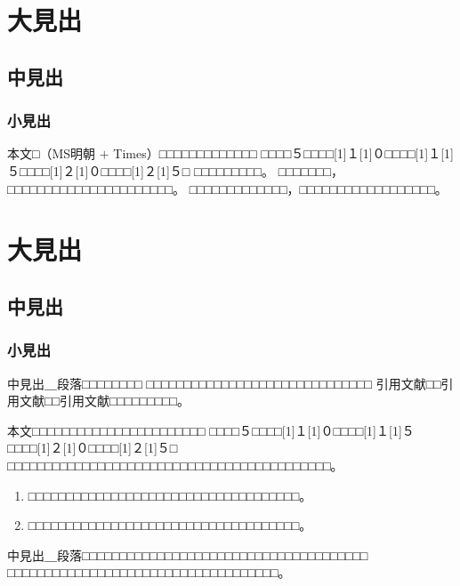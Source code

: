 \documentclass[fleqn]{ieej-report2}%
\begin{document}
%
%
\section{大見出}

\subsection{中見出}

\subsubsection{小見出}
本文□（MS明朝 $+$ Times）□□□□□□□□□□□□□
□□□□５□□□□\scalebox{0.5}[1]{１}\scalebox{0.5}[1]{０}□□□□\scalebox{0.5}[1]{１}\scalebox{0.5}[1]{５}□□□□\scalebox{0.5}[1]{２}\scalebox{0.5}[1]{０}□□□□\scalebox{0.5}[1]{２}\scalebox{0.5}[1]{５}□
□□□□□□□□□。
□□□□□□□，□□□□□□□□□□□□□□□□□□□□□□。
□□□□□□□□□□□□□，□□□□□□□□□□□□□□□□□□。

\section{大見出}

\subsection{中見出}

\subsubsection{小見出}


中見出＿段落□□□□□□□□
□□□□□□□□□□□□□□□□□□□□□□□□□□□□□□
引用文献\cite{IEEJformat}□□引用文献\cite{bib2,bib3}□□引用文献\cite{bib4,bib5,bib6,bib7}□□□□□□□□□。

本文□□□□□□□□□□□□□□□□□□□□□□□
□□□□５□□□□\scalebox{0.5}[1]{１}\scalebox{0.5}[1]{０}□□□□\scalebox{0.5}[1]{１}\scalebox{0.5}[1]{５}□□□□\scalebox{0.5}[1]{２}\scalebox{0.5}[1]{０}□□□□\scalebox{0.5}[1]{２}\scalebox{0.5}[1]{５}□
□□□□□□□□□□□□□□□□□□□□□□□□□□□□□□□□□□□□□□□□□□□。
\begin{enumerate}
\item
□□□□□□□□□□□□□□□□□□□□□□□□□□□□□□□□□□□□。
\item
□□□□□□□□□□□□□□□□□□□□□□□□□□□□□□□□□□□□。
\end{enumerate}

中見出＿段落□□□□□□□□□□□□□□□□□□□□□□□□□□□□□□□□□□□□□□
□□□□□□□□□□□□□□□□□□□□□□□□□□□□□□□□□□□□。
\end{document}
